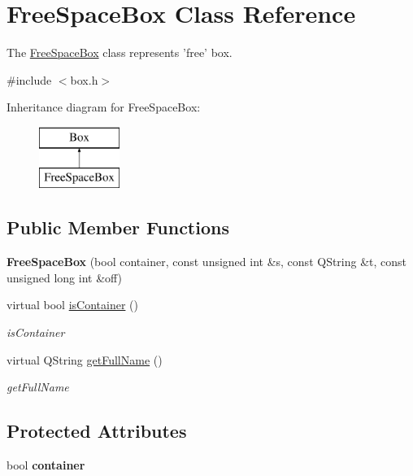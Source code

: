 \hypertarget{class_free_space_box}{\section{Free\-Space\-Box Class Reference}
\label{class_free_space_box}
}


The \hyperlink{class_free_space_box}{Free\-Space\-Box} class represents 'free' box.  




{\ttfamily \#include $<$box.\-h$>$}

Inheritance diagram for Free\-Space\-Box\-:\begin{figure}[H]
\begin{center}
\leavevmode
\includegraphics[height=2.000000cm]{class_free_space_box}
\end{center}
\end{figure}
\subsection*{Public Member Functions}
\begin{DoxyCompactItemize}
\item 
\hypertarget{class_free_space_box_aee1593f02d6d2d647b1a4c21da1ec0c8}{{\bfseries Free\-Space\-Box} (bool container, const unsigned int \&s, const Q\-String \&t, const unsigned long int \&off)}\label{class_free_space_box_aee1593f02d6d2d647b1a4c21da1ec0c8}

\item 
virtual bool \hyperlink{class_free_space_box_a704a3d5d180b53f0ef928be4213f6705}{is\-Container} ()
\begin{DoxyCompactList}\small\item\em is\-Container \end{DoxyCompactList}\item 
virtual Q\-String \hyperlink{class_free_space_box_a28d0e0e3e5111d4a741d03eeab1b40ea}{get\-Full\-Name} ()
\begin{DoxyCompactList}\small\item\em get\-Full\-Name \end{DoxyCompactList}\end{DoxyCompactItemize}
\subsection*{Protected Attributes}
\begin{DoxyCompactItemize}
\item 
\hypertarget{class_free_space_box_aa44c86bf1155aff8a38a6719cab22085}{bool {\bfseries container}}\label{class_free_space_box_aa44c86bf1155aff8a38a6719cab22085}

\end{DoxyCompactItemize}


